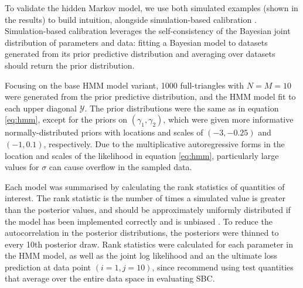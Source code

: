 To validate the hidden Markov model, we use
both simulated examples (shown in the results)
to build intuition, alongside
simulation-based calibration \citep{talts2018,modrak2023}.
Simulation-based calibration leverages the self-consistency
of the Bayesian joint distribution of parameters and
data: fitting a Bayesian model to datasets generated
from its prior predictive distribution and averaging 
over datasets should return the prior distribution.

Focusing on the base HMM model variant, 1000 
full-triangles with $N = M = 10$ were generated
from the prior predictive distribution, and the
HMM model fit to each upper diagonal $\mathcal{Y}$.
The prior distributions were the same as in
equation \ref{eq:hmm}, except for the priors
on $(\gamma_{1}, \gamma_{2})$, which were 
given more informative normally-distributed priors
with locations and scales of $(-3, -0.25)$ and
$(-1, 0.1)$, respectively. Due to the
multiplicative autoregressive forms in the
location and scales of the likelihood in
equation \ref{eq:hmm}, particularly
large values for $\sigma$ can cause overflow
in the sampled data.

Each model was summarised by
calculating the rank statistics of quantities
of interest.
The rank statistic is the number of times a
simulated value is greater than the posterior values,
and should be approximately uniformly distributed
if the model has been implemented correctly and is
unbiased \citep{talts2018}. To reduce the autocorrelation
in the posterior distributions, the posteriors were
thinned to every 10th posterior draw.
Rank statistics
were calculated for each parameter in the HMM model,
as well as the joint log likelihood and
an the ultimate loss prediction at data point
$(i=1, j=10)$, since \cite{modrak2023} recommend
using test quantities that average over the entire
data space in evaluating SBC.

